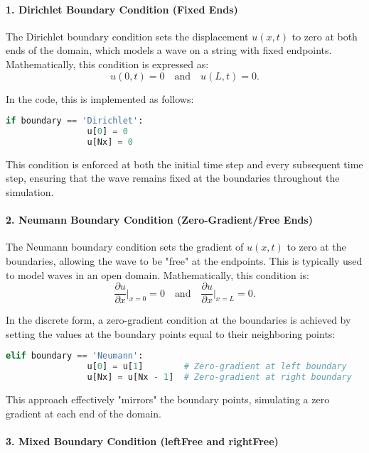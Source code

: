 \documentclass{article}
\begin{document}
		\paragraph{ 1. Dirichlet Boundary Condition (Fixed Ends)}
		
		The Dirichlet boundary condition sets the displacement \( u(x, t) \) to zero at both ends of the domain, which models a wave on a string with fixed endpoints. Mathematically, this condition is expressed as:
		\[
		u(0, t) = 0 \quad \text{and} \quad u(L, t) = 0.
		\]
		
		In the code, this is implemented as follows:
		\begin{lstlisting}[language=Python, caption=Dirichlet Boundary Condition]
			if boundary == 'Dirichlet':
				u[0] = 0
				u[Nx] = 0
		\end{lstlisting}
		
		This condition is enforced at both the initial time step and every subsequent time step, ensuring that the wave remains fixed at the boundaries throughout the simulation.
		
		\paragraph{2. Neumann Boundary Condition (Zero-Gradient/Free Ends)}
		
		The Neumann boundary condition sets the gradient of \( u(x, t) \) to zero at the boundaries, allowing the wave to be "free" at the endpoints. This is typically used to model waves in an open domain. Mathematically, this condition is:
		\[
		\frac{\partial u}{\partial x}\Big|_{x=0} = 0 \quad \text{and} \quad \frac{\partial u}{\partial x}\Big|_{x=L} = 0.
		\]
		
		In the discrete form, a zero-gradient condition at the boundaries is achieved by setting the values at the boundary points equal to their neighboring points:
		\begin{lstlisting}[language=Python, caption=Neumann Boundary Condition]
			elif boundary == 'Neumann':
				u[0] = u[1]        # Zero-gradient at left boundary
				u[Nx] = u[Nx - 1]  # Zero-gradient at right boundary
		\end{lstlisting}
		
		This approach effectively "mirrors" the boundary points, simulating a zero gradient at each end of the domain.
		
		\paragraph{ 3. Mixed Boundary Condition (leftFree and rightFree)}
		
\end{document}
